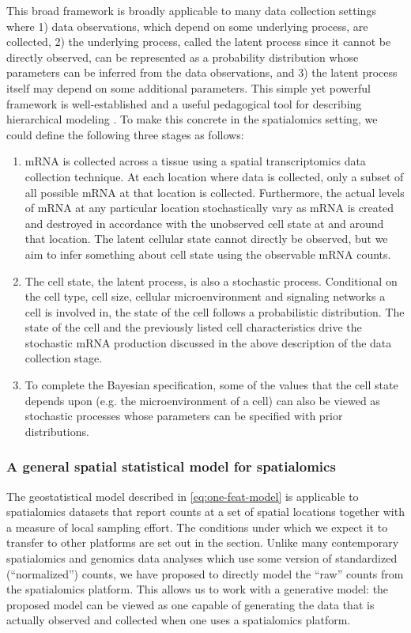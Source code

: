 \documentclass[10pt,letterpaper]{article}
\begin{document}
This broad framework is broadly applicable to many data collection settings where 1) data observations, which depend on some underlying process, are collected, 2) the underlying process, called the latent process since it cannot be directly observed, can be represented as a probability distribution whose parameters can be inferred from the data observations, and 3) the latent process itself may depend on some additional parameters. This simple yet powerful framework is well-established and a useful pedagogical tool for describing hierarchical modeling \cite{cressie2011statistics}. To make this concrete in the spatialomics setting, we could define the following three stages as follows:
\begin{enumerate}
    \item mRNA is collected across a tissue using a spatial transcriptomics data collection technique. At each location where data is collected, only a subset of all possible mRNA at that location is collected. Furthermore, the actual levels of mRNA at any particular location stochastically vary as mRNA is created and destroyed in accordance with the unobserved cell state at and around that location. The latent cellular state cannot directly be observed, but we aim to infer something about cell state using the observable mRNA counts.
    \item The cell state, the latent process, is also a stochastic process. Conditional on the cell type, cell size, cellular microenvironment and signaling networks a cell is involved in, the state of the cell follows a probabilistic distribution. The state of the cell and the previously listed cell characteristics drive the stochastic mRNA production discussed in the above description of the data collection stage.
    \item To complete the Bayesian specification, some of the values that the cell state depends upon (e.g. the microenvironment of a cell) can also be viewed as stochastic processes whose parameters can be specified with prior distributions.
\end{enumerate}

\subsubsection*{A general spatial statistical model for spatialomics}

The geostatistical model described in \eqref{eq:one-feat-model} is applicable to spatialomics datasets that report counts at a set of spatial locations together with a measure of local sampling effort. The conditions under which we expect it to transfer to other platforms are set out in the  section. Unlike many contemporary spatialomics and genomics data analyses which use some version of standardized (``normalized'') counts, we have proposed to directly model the ``raw'' counts from the spatialomics platform. This allows us to work with a generative model: the proposed model can be viewed as one capable of generating the data that is actually observed and collected when one uses a spatialomics platform.
\end{document}
